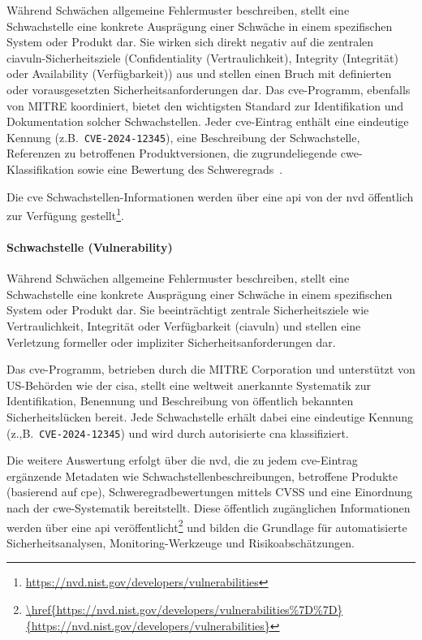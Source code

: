 Während Schwächen allgemeine Fehlermuster beschreiben, stellt eine Schwachstelle eine konkrete Ausprägung einer Schwäche in einem spezifischen System oder Produkt dar.
Sie wirken sich direkt negativ auf die zentralen \acrshort{ciavuln}-Sicherheitsziele (Confidentiality (Vertraulichkeit), Integrity (Integrität) oder Availability (Verfügbarkeit)) aus und stellen einen Bruch mit definierten oder vorausgesetzten Sicherheitsanforderungen dar.
Das \acrshort{cve}-Programm, ebenfalls von MITRE koordiniert, bietet den wichtigsten Standard zur Identifikation und Dokumentation solcher Schwachstellen.
Jeder \acrshort{cve}-Eintrag enthält eine eindeutige Kennung (z.B.\ \verb+CVE-2024-12345+), eine Beschreibung der Schwachstelle, Referenzen zu betroffenen Produktversionen, die zugrundeliegende \acrshort{cwe}-Klassifikation sowie eine Bewertung des Schweregrads\ \autocite{Ross_Winstead_McEvilley_2022, CveGlossaryCommonVulnerabilitiesAndExposures12mai2025}.

Die \acrshort{cve} Schwachstellen-Informationen werden über eine \acrshort{api} von der \acrshort{nvd} öffentlich zur Verfügung gestellt\footnote{\url{https://nvd.nist.gov/developers/vulnerabilities}}.

\paragraph{Schwachstelle (Vulnerability)}

Während Schwächen allgemeine Fehlermuster beschreiben, stellt eine Schwachstelle eine konkrete Ausprägung einer Schwäche in einem spezifischen System oder Produkt dar.
Sie beeinträchtigt zentrale Sicherheitsziele wie Vertraulichkeit, Integrität oder Verfügbarkeit (\acrfull{ciavuln}) und stellen eine Verletzung formeller oder impliziter Sicherheitsanforderungen dar.

Das \acrshort{cve}-Programm, betrieben durch die MITRE Corporation und unterstützt von US-Behörden wie der \acrfull{cisa}, stellt eine weltweit anerkannte Systematik zur Identifikation, Benennung und Beschreibung von öffentlich bekannten Sicherheitslücken bereit.
Jede Schwachstelle erhält dabei eine eindeutige Kennung (z.,B.\ \verb+CVE-2024-12345+) und wird durch autorisierte \acrfull{cna} klassifiziert.

Die weitere Auswertung erfolgt über die \acrshort{nvd}, die zu jedem \acrshort{cve}-Eintrag ergänzende Metadaten wie Schwachstellenbeschreibungen, betroffene Produkte (basierend auf \acrshort{cpe}), Schweregradbewertungen mittels CVSS und eine Einordnung nach der \acrshort{cwe}-Systematik bereitstellt.
Diese öffentlich zugänglichen Informationen werden über eine \acrshort{api} veröffentlicht\footnote{\url{\href{https://nvd.nist.gov/developers/vulnerabilities%7D%7D}{https://nvd.nist.gov/developers/vulnerabilities}}} und bilden die Grundlage für automatisierte Sicherheitsanalysen, Monitoring-Werkzeuge und Risikoabschätzungen.

